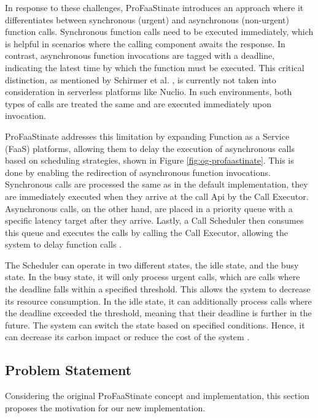 In response to these challenges, ProFaaStinate introduces an approach where it differentiates between synchronous (urgent) and asynchronous (non-urgent) function calls. Synchronous function calls need to be executed immediately, which is helpful in scenarios where the calling component awaits the response. In contrast, asynchronous function invocations are tagged with a deadline, indicating the latest time by which the function must be executed. This critical distinction, as mentioned by Schirmer et al. \cite{schirmer2023profaastinate}, is currently not taken into consideration in serverless platforms like Nuclio. In such environments, both types of calls are treated the same and are executed immediately upon invocation.

ProFaaStinate addresses this limitation by expanding Function as a Service (FaaS) platforms, allowing them to delay the execution of asynchronous calls based on scheduling strategies, shown in Figure \ref{fig:og-profaastinate}. This is done by enabling the redirection of asynchronous function invocations. Synchronous calls are processed the same as in the default implementation, they are immediately executed when they arrive at the call Api by the Call Executor. Asynchronous calls, on the other hand, are placed in a priority queue with a specific latency target after they arrive. Lastly, a Call Scheduler then consumes this queue and executes the calls by calling the Call Executor, allowing the system to delay function calls \cite{schirmer2023profaastinate}.

The Scheduler can operate in two different states, the idle state, and the busy state. In the busy state, it will only process urgent calls, which are calls where the deadline falls within a specified threshold. This allows the system to decrease its resource consumption. In the idle state, it can additionally process calls where the deadline exceeded the threshold, meaning that their deadline is further in the future. The system can switch the state based on specified conditions. Hence, it can decrease its carbon impact or reduce the cost of the system \cite{schirmer2023profaastinate}.


\subsection{Problem Statement}
Considering the original ProFaaStinate concept and implementation, this section proposes the motivation for our new implementation. \cite{schirmer2023profaastinate}

